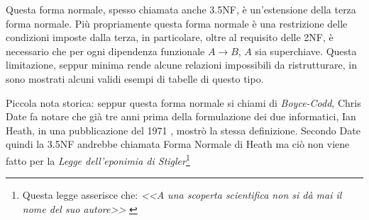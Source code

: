 Questa forma normale, spesso chiamata anche 3.5NF, è un'estensione della terza forma normale. Più propriamente questa forma normale è una restrizione delle condizioni imposte dalla terza, in particolare, oltre al requisito delle 2NF, è necessario che per ogni dipendenza funzionale $A \rightarrow B$, $A$ sia superchiave. Questa limitazione, seppur minima rende alcune relazioni impossibili da ristrutturare, in \cite{wiki:bcnf} sono mostrati alcuni validi esempi di tabelle di questo tipo.

Piccola nota storica: seppur questa forma normale si chiami di \emph{Boyce-Codd}, Chris Date fa notare che già tre anni prima della formulazione dei due informatici, Ian Heath, in una pubblicazione del 1971 \cite{heath:bcnf}, mostrò la stessa definizione. Secondo Date quindi la 3.5NF andrebbe chiamata Forma Normale di Heath ma ciò non viene fatto per la \emph{Legge dell'eponimia di Stigler}\footnote{Questa legge asserisce che: \emph{<<A una scoperta scientifica non si dà mai il nome del suo autore>>} \cite{stigler} }